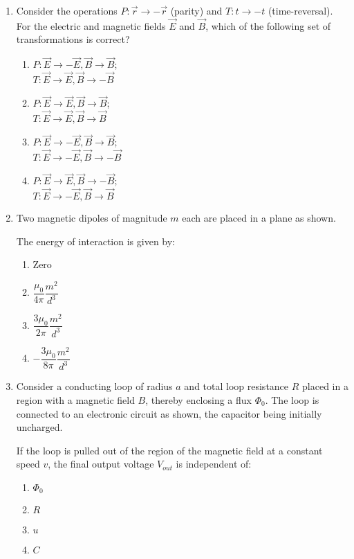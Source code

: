 \documentclass[journal]{IEEEtran}
\begin{document}
\begin{enumerate}
\item Consider the operations $P: \vec{r} \rightarrow -\vec{r}$ (parity) and $T: t \rightarrow -t$ (time-reversal). For the electric and magnetic fields $\vec{E}$ and $\vec{B}$, which of the following set of transformations is correct?
\begin{multicols}{2}
\begin{enumerate}
\item $P: \vec{E} \to -\vec{E}, \vec{B} \to \vec{B}$;\\ $T: \vec{E} \to \vec{E}, \vec{B} \to -\vec{B}$
\item $P: \vec{E} \to \vec{E}, \vec{B} \to \vec{B}$;\\ $T: \vec{E} \to \vec{E}, \vec{B} \to \vec{B}$
\item $P: \vec{E} \to -\vec{E}, \vec{B} \to \vec{B}$;\\ $T: \vec{E} \to -\vec{E}, \vec{B} \to -\vec{B}$
\item $P: \vec{E} \to \vec{E}, \vec{B} \to -\vec{B}$; \\$T: \vec{E} \to -\vec{E}, \vec{B} \to \vec{B}$
\end{enumerate}
\end{multicols}

\item Two magnetic dipoles of magnitude $m$ each are placed in a plane as shown.


The energy of interaction is given by:
\begin{multicols}{2}
\begin{enumerate}
\item Zero
\item $\dfrac{\mu_0}{4\pi} \dfrac{m^2}{d^3}$
\item $\dfrac{3\mu_0}{2\pi} \dfrac{m^2}{d^3}$
\item $-\dfrac{3\mu_0}{8\pi} \dfrac{m^2}{d^3}$
\end{enumerate}
\end{multicols}

\item Consider a conducting loop of radius $a$ and total loop resistance $R$ placed in a region with a magnetic field $B$, thereby enclosing a flux $\Phi_0$. The loop is connected to an electronic circuit as shown, the capacitor being initially uncharged.


If the loop is pulled out of the region of the magnetic field at a constant speed $v$, the final output voltage $V_{out}$ is independent of:
\begin{multicols}{2}
\begin{enumerate}
 \item $\Phi_0$
 \item $R$
 \item $u$
 \item $C$
 \end{enumerate}
 \end{multicols}

 
 \end{enumerate}
\end{document}
